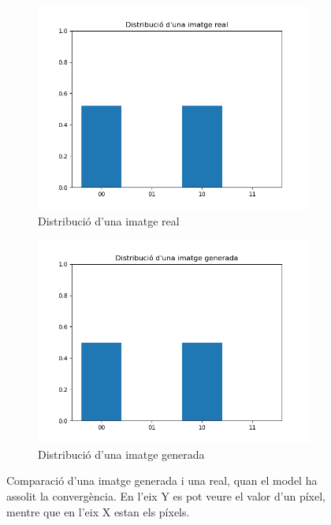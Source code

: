 \begin{figure}[H]
	\begin{subfigure}{0.51\textwidth}
		\includegraphics[width=\linewidth]{figures/model/real_distribution.png}
		\caption{Distribució d'una imatge real} \label{fig:1a}
	\end{subfigure}%
	\hspace*{\fill}   %
	\begin{subfigure}{0.51\textwidth}
		\includegraphics[width=\linewidth]{figures/model/fake_distribution.png}
		\caption{Distribució d'una imatge generada} \label{fig:1b}
	\end{subfigure}%
	\hspace*{\fill}
	\caption{Comparació d'una imatge generada i una real, quan el model ha assolit la convergència. En l'eix Y es pot veure el valor d'un píxel, mentre que en l'eix X estan els píxels. }
	\label{fig:comp_imatge} 
\end{figure}


